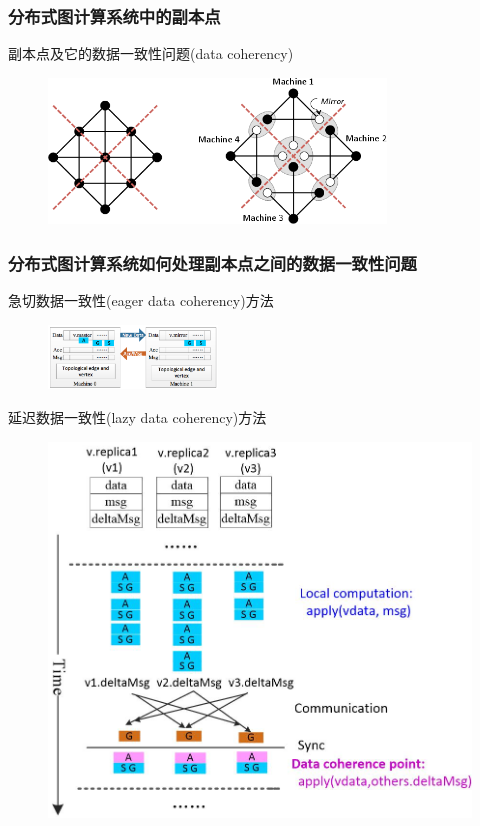 \documentclass[10pt]{beamer}
\begin{document}
\begin{frame}%
  \frametitle{分布式图计算系统中的副本点}
  \begin{block}
    {副本点及它的数据一致性问题(data coherency)}
    \begin{figure}[!htbp]
      \centering
      \includegraphics[width=0.8\textwidth]{Img/mirror}
      \label{fig:mirror}
    \end{figure}
  \end{block}
\end{frame}


\begin{frame}%
  \frametitle{分布式图计算系统如何处理副本点之间的数据一致性问题}
  \begin{block}
    {急切数据一致性(eager data coherency)方法}
    \begin{figure}[!htbp]
      \centering
      \includegraphics[width=0.40\textwidth]{Img/pg-eager}
    \end{figure}
  \end{block}
  \begin{block}
    {延迟数据一致性(lazy data coherency)方法}
    \begin{figure}[!htbp]
      \centering
      \includegraphics[height=0.3\textwidth]{Img/lazy_data_coherency.png}
    \end{figure}
  \end{block}
\end{frame}
\end{document}
